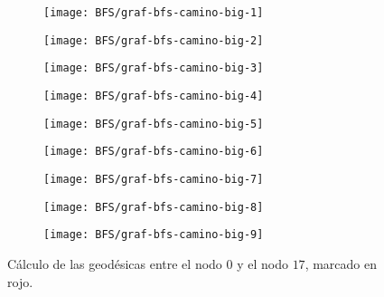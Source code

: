 \begin{figure}[htb]
	\centering
	\begin{subfigure}{0.28\linewidth}
		\texttt{[image: BFS/graf-bfs-camino-big-1]}
		\caption{}
	\end{subfigure}
	\begin{subfigure}{0.28\linewidth}
		\texttt{[image: BFS/graf-bfs-camino-big-2]}
		\caption{}
	\end{subfigure}
	\begin{subfigure}{0.28\linewidth}
		\texttt{[image: BFS/graf-bfs-camino-big-3]}
		\caption{}
	\end{subfigure}
	\begin{subfigure}{0.28\linewidth}
		\texttt{[image: BFS/graf-bfs-camino-big-4]}
		\caption{}
	\end{subfigure}
	\begin{subfigure}{0.28\linewidth}
		\texttt{[image: BFS/graf-bfs-camino-big-5]}
		\caption{}
	\end{subfigure}
	\begin{subfigure}{0.28\linewidth}
		\texttt{[image: BFS/graf-bfs-camino-big-6]}
		\caption{}
	\end{subfigure}
	\begin{subfigure}{0.28\linewidth}
		\texttt{[image: BFS/graf-bfs-camino-big-7]}
		\caption{}
	\end{subfigure}
	\begin{subfigure}{0.28\linewidth}
		\texttt{[image: BFS/graf-bfs-camino-big-8]}
		\caption{}
	\end{subfigure}
	\begin{subfigure}{0.28\linewidth}
		\texttt{[image: BFS/graf-bfs-camino-big-9]}
		\caption{}
	\end{subfigure}
	\caption{Cálculo de las geodésicas entre el nodo $0$ y el nodo $17$, marcado en rojo.}
	\label{fig:bfs-camino-big}
\end{figure}


\endinput
